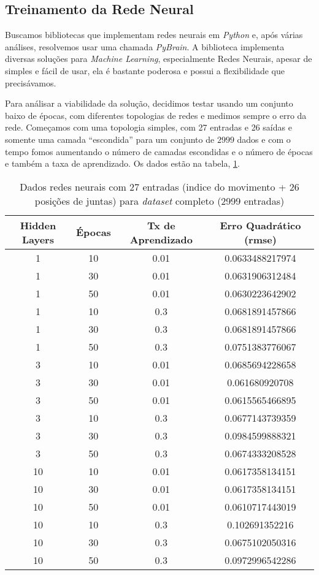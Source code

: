 \documentclass[twoside,conference,a4paper]{IEEEtran}
\begin{document}
\subsection{Treinamento da Rede Neural}

Buscamos bibliotecas que implementam redes neurais em \textsl{Python} e, após várias análises, resolvemos usar uma chamada \textsl{PyBrain}\cite{pybrain}. A biblioteca implementa diversas soluções para \textsl{Machine Learning}, especialmente Redes Neurais, apesar de simples e fácil de usar, ela é bastante poderosa e possui a flexibilidade que precisávamos.

Para análisar a viabilidade da solução, decidimos testar usando um conjunto baixo de épocas, com diferentes topologias de redes e medimos sempre o erro da rede. Começamos com uma topologia simples, com 27 entradas e 26 saídas e somente uma camada ``escondida'' para um conjunto de $2999$ dados e com o tempo fomos aumentando o número de camadas escondidas e o número de épocas e também a taxa de aprendizado. Os dados estão na tabela, \ref{redes_neurais_tabela_1}.


 \begin{table}[h]
 \caption{Dados redes neurais com 27 entradas (indice do movimento + 26 posições de juntas) para \textsl{dataset} completo (2999 entradas)}
 \label{redes_neurais_tabela_1}
 \begin{center}
 \begin{tabular}{|c|c|c|c|}
 \hline
 Hidden Layers & Épocas & Tx de Aprendizado & Erro Quadrático (rmse) \\
 \hline
 1 & 10 & 0.01 & 0.0633488217974 \\
 1 & 30 & 0.01 & 0.0631906312484 \\
 1 & 50 & 0.01 & 0.0630223642902 \\
 1 & 10 & 0.3 & 0.0681891457866 \\
 1 & 30 & 0.3 & 0.0681891457866 \\
 1 & 50 & 0.3 & 0.0751383776067 \\
 3 & 10 &  0.01 & 0.0685694228658 \\
 3 &  30 & 0.01 & 0.061680920708 \\
 3 &  50 & 0.01 & 0.0615565466895 \\
 3 & 10 &  0.3 & 0.0677143739359 \\
 3 &  30 & 0.3 & 0.0984599888321 \\
 3 &  50 & 0.3 & 0.0674333208528 \\
 10 & 10 & 0.01 & 0.0617358134151\\
10 &  30 & 0.01 &  0.0617358134151\\
10 &  50 & 0.01 & 0.0610717443019 \\
10 & 10 & 0.3  & 0.102691352216 \\
10 &  30 & 0.3 & 0.0675102050316 \\
10 &  50 & 0.3 & 0.0972996542286 \\
 \hline
 \end{tabular}
 \end{center}
 \end{table}
\end{document}

